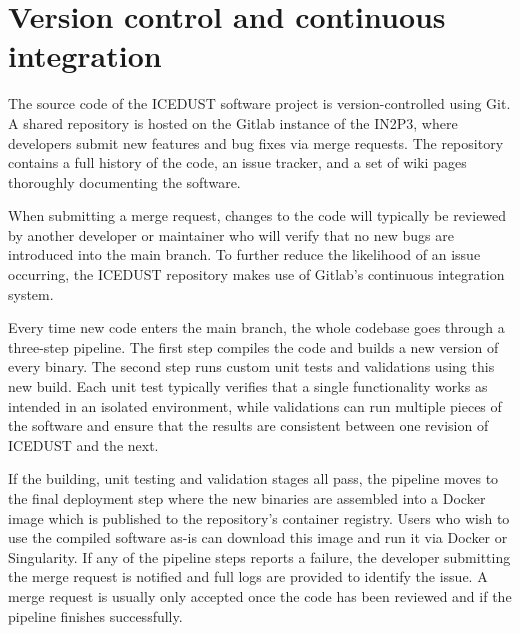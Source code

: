 
\section{Version control and continuous integration}

The source code of the ICEDUST software project is version-controlled using Git. A shared repository is hosted on the Gitlab instance of the IN2P3, where developers submit new features and bug fixes via merge requests. The repository contains a full history of the code, an issue tracker, and a set of wiki pages thoroughly documenting the software.

When submitting a merge request, changes to the code will typically be reviewed by another developer or maintainer who will verify that no new bugs are introduced into the main branch. To further reduce the likelihood of an issue occurring, the ICEDUST repository makes use of Gitlab's continuous integration system.

Every time new code enters the main branch, the whole codebase goes through a three-step pipeline. The first step compiles the code and builds a new version of every binary. The second step runs custom unit tests and validations using this new build. Each unit test typically verifies that a single functionality works as intended in an isolated environment, while validations can run multiple pieces of the software and ensure that the results are consistent between one revision of ICEDUST and the next.

If the building, unit testing and validation stages all pass, the pipeline moves to the final deployment step where the new binaries are assembled into a Docker image which is published to the repository's container registry. Users who wish to use the compiled software as-is can download this image and run it via Docker or Singularity.
If any of the pipeline steps reports a failure, the developer submitting the merge request is notified and full logs are provided to identify the issue. A merge request is usually only accepted once the code has been reviewed and if the pipeline finishes successfully.

